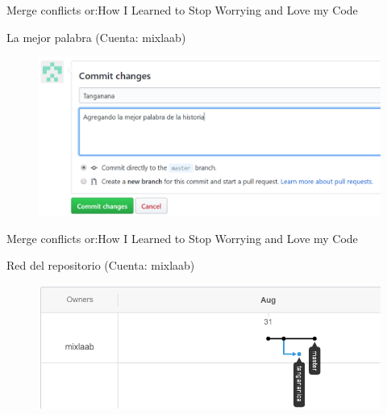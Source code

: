 \documentclass[10pt]{beamer}
\begin{document}
\begin{frame}{Merge conflicts or:}{How I Learned to Stop Worrying and Love my Code \heartsuit}

\begin{block}{La mejor palabra (Cuenta: mixlaab)}

\begin{figure}[h!]
\centering
\includegraphics [scale=0.3]{tanganana2}
\label{fig:issues}
\end{figure}
    
\end{block}

\end{frame}

\begin{frame}{Merge conflicts or:}{How I Learned to Stop Worrying and Love my Code \heartsuit}

\begin{block}{Red del repositorio (Cuenta: mixlaab)}

\begin{figure}[h!]
\centering
\includegraphics [scale=0.3]{network}
\label{fig:issues}
\end{figure}
    
\end{block}

\end{frame}

\end{document}
